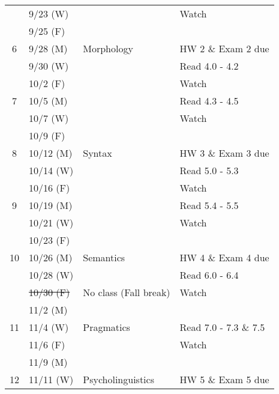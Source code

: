 \documentclass{article}
\begin{document}
\begin{longtable}{c l l | l}
            & 9/23 (W)    &                                 & Watch\\
            & 9/25 (F)    &                                 & \\
      \hline
      6     & 9/28 (M)    & Morphology                      & HW 2 \& Exam 2 due\\
            & 9/30 (W)    &                                 & Read 4.0 - 4.2\\
            & 10/2 (F)    &                                 & Watch\\
      \hline
      7     & 10/5 (M)    &                                 & Read 4.3 - 4.5\\
            & 10/7 (W)    &                                 & Watch\\
            & 10/9 (F)    &                                 & \\
      \hline
      8     & 10/12 (M)   & Syntax                          & HW 3 \& Exam 3 due\\
            & 10/14 (W)   &                                 & Read 5.0 - 5.3\\
            & 10/16 (F)   &                                 & Watch\\
      \hline
      9     & 10/19 (M)   &                                 & Read 5.4 - 5.5\\
            & 10/21 (W)   &                                 & Watch\\
            & 10/23 (F)   &                                 & \\
      \hline
      10    & 10/26 (M)   & Semantics                       & HW 4 \& Exam 4 due\\
            & 10/28 (W)   &                                 & Read 6.0 - 6.4\\
            & \sout{10/30 (F)}   & No class (Fall break)           & Watch\\
            & 11/2 (M)    &                                 & \\
      \hline
      11    & 11/4 (W)    & Pragmatics                      & Read 7.0 - 7.3 \& 7.5\\
            & 11/6 (F)    &                                 & Watch\\
            & 11/9 (M)    &                                 & \\
      \hline
      12    & 11/11 (W)   & Psycholinguistics               & HW 5 \& Exam 5 due\\

\end{longtable}
\end{document}
